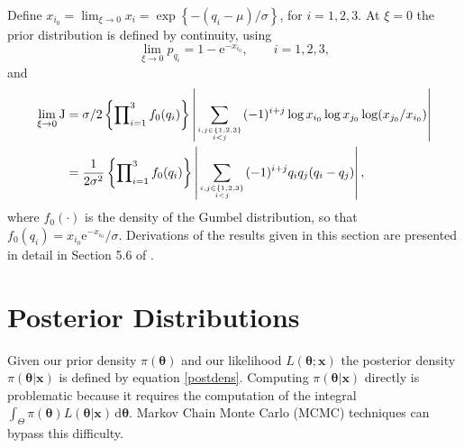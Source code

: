 \documentclass[11pt,a4paper]{article}
\newcommand{\bs}{\boldsymbol}
\newcommand{\sfrac}[2]{\genfrac{}{}{0pt}{}{#1}{#2}}
\begin{document}
Define $x_{i_0} = \lim_{\xi\rightarrow0} x_i = \exp \left\{ -( q_i-\mu)/\sigma  \right\}$, for $i=1,2,3$. At $\xi=0$ the prior distribution is defined by continuity, using 
\begin{equation*}
\lim_{\xi\rightarrow0}p_{q_i} = 1 - \text{e}^{ - x_{i_0}},  \qquad i=1,2,3,
\end{equation*}
and 
\begin{align*}
\lim_{\xi\rightarrow0}\text{J} &= \sigma/2 \left\{ \prod\nolimits_{i=1}^3 f_0(q_i) \right\} \left| \sum_{\sfrac{i,j \in \{1,2,3\}}{i < j}} (-1)^{i+j} \log x_{i_0} \log x_{j_0} \log (x_{j_0} / x_{i_0}) \right| \\
&= \frac{1}{2\sigma^2} \left\{ \prod\nolimits_{i=1}^3 f_0(q_i) \right\} \left| \sum_{\sfrac{i,j \in \{1,2,3\}}{i < j}} (-1)^{i+j} q_i q_j (q_i - q_j) \right|,
\end{align*}
where $f_0(\cdot)$ is the density of the Gumbel distribution, so that $f_0(q_i) = x_{i_0}\text{e}^{-x_{i_0}}/\sigma$.
Derivations of the results given in this section are presented in detail in Section 5.6 of \citet{step:phd}.

\section{Posterior Distributions}
\setcounter{footnote}{0}
\label{posterior}

Given our prior density $\pi(\bs{\theta})$ and our likelihood $L(\bs{\theta};\bs{x})$ the posterior density $\pi(\bs{\theta}|\bs{x})$ is defined by equation \eqref{postdens}.
Computing $\pi(\bs{\theta}|\bs{x})$ directly is problematic because it requires the computation of the integral $\int_{\Theta} \pi(\bs{\theta})L(\bs{\theta}|\bs{x}) \, \text{d}\bs{\theta}$.
Markov Chain Monte Carlo (MCMC) techniques can bypass this difficulty.
\end{document}
